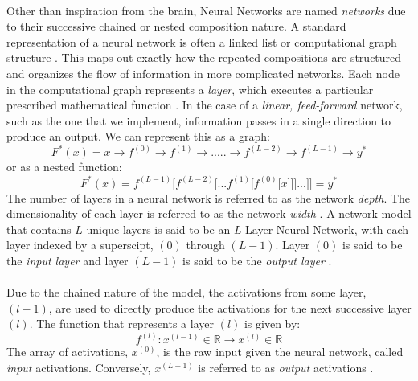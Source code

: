 \documentclass[12pt,letterpaper]{article}
\begin{document}
\paragraph*{}Other than inspiration from the brain, Neural Networks are named \textit{networks} due to their successive chained or nested composition nature. A standard representation of a neural network is often a linked list or computational graph structure \cite{Goodfellow}. This maps out exactly how the repeated compositions are structured and organizes the flow of information in more complicated networks. Each node in the computational graph represents a \textit{layer}, which executes a particular prescribed mathematical function \cite{Goodfellow}. In the case of a \textit{linear, feed-forward} network, such as the one that we implement, information passes in a single direction to produce an output. We can represent this as a graph:
\begin{equation}
\label{eqn-FunctionGraph}
F^*(x) = x \rightarrow f^{(0)} \rightarrow f^{(1)} \rightarrow ..... \rightarrow
f^{(L-2)} \rightarrow f^{(L-1)} \rightarrow y^*
\end{equation}
or as a nested function:
\begin{equation}
\label{eqn-FunctionChain}
F^*(x) = f^{(L-1)}\big[f^{(L-2)}\big[...f^{(1)}\big[f^{(0)}\big[x\big]\big]\big]...\big]\big] = y^*
\end{equation}
The number of layers in a neural network is referred to as the network \textit{depth}. The dimensionality of each layer is referred to as the network \textit{width} \cite{Geron,Loy}.
A network model that contains $L$ unique layers is said to be an $L$-Layer Neural Network, with each layer indexed by a superscipt, $(0)$ through $(L-1)$. Layer $(0)$ is said to be the \textit{input layer} and layer $(L-1)$ is said to be the \textit{output layer} \cite{Geron,Loy}. 

\paragraph*{}Due to the chained nature of the model, the activations from some layer, $(l-1)$, are used to directly produce the activations for the next successive layer $(l)$. The function that represents a layer $(l)$ is given by:
\begin{equation}
\label{eqn-altLayerFunction}
f^{(l)} : x^{(l-1)} \in \mathbb{R} \rightarrow x^{(l)} \in \mathbb{R}
\end{equation}
The array of activations, $x^{(0)}$, is the raw input given the neural network, called \textit{input} activations. Conversely, $x^{(L-1)}$ is referred to as \textit{output} activations \cite{Geron,James,Loy}.
\end{document}
